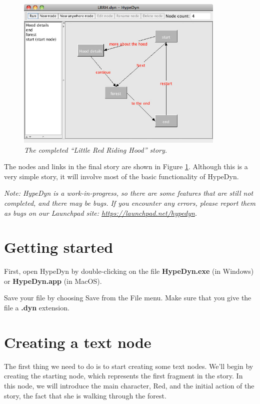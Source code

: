 \documentclass{article}
\begin{document}
\begin{figure}[ht]
  \centering
  \includegraphics[width=10cm]{images/hypedyn-tutorial-1-figure-1}
  \caption{\textit{The completed ``Little Red Riding Hood'' story.}}
  \label{fig:tut1:completed_story}
\end{figure} 

The nodes and links in the final story are shown in Figure
\ref{fig:tut1:completed_story}. Although this is a very simple story, it will involve
most of the basic functionality of HypeDyn.

\textit{Note:  HypeDyn is a work-in-progress, so there are some features that are still
not completed, and there may be bugs. If you encounter any errors, please
report them as bugs on our Launchpad site: \url{https://launchpad.net/hypedyn}.}

\section{Getting started}

First, open HypeDyn by double-clicking on the file \textbf{HypeDyn.exe} (in
Windows) or \textbf{HypeDyn.app} (in MacOS).

Save your file by choosing Save from the File menu. Make sure that you give the
file a \textbf{.dyn} extension.

\section{Creating a text node}

The first thing we need to do is to start creating some text nodes. We'll begin
by creating the starting node, which represents the first fragment in the story.
In this node, we will introduce the main character, Red, and the initial action of
the story, the fact that she is walking through the forest.
 
\end{document}
